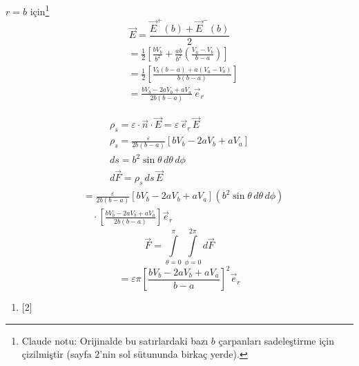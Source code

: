 \documentclass[11pt,a4paper]{article}
\begin{document}
$r=b$ için\footnote{Claude notu: Orijinalde bu satırlardaki bazı $b$ çarpanları sadeleştirme için çizilmiştir (sayfa 2'nin sol sütununda birkaç yerde).}
\[ \vec E=\frac{\vec E^{+}(b)+\vec E^{-}(b)}{2} \]
\begin{align*}
&=\frac12\left[\frac{bV_b}{b^2}+\frac{ab}{b^2}\left(\frac{V_a-V_b}{b-a}\right)\right]\\[2mm]
&=\frac12\left[\frac{V_b(b-a)+a(V_a-V_b)}{b(b-a)}\right]\\[2mm]
&=\frac{bV_b-2aV_b+aV_a}{2b(b-a)}\,\vec e_r
\end{align*}

\begin{gather*}
\rho_s=\varepsilon\cdot\vec n\cdot\vec E=\varepsilon\,\vec e_r\,\vec E\\
\rho_s=\frac{\varepsilon}{2b(b-a)}\left[bV_b-2aV_b+aV_a\right]\\
ds=b^2\sin\theta\,d\theta\,d\phi\\
d\vec F=\rho_s\,ds\,\vec E
\end{gather*}
\begin{align*}
&=\frac{\varepsilon}{2b(b-a)}\left[bV_b-2aV_b+aV_a\right]\left(b^2\sin\theta\,d\theta\,d\phi\right)\\
&\quad\cdot\left[\frac{bV_b-2aV_b+aV_a}{2b(b-a)}\right]\vec e_r
\end{align*}
\[ \vec F=\int\limits_{\theta=0}^{\pi}\int\limits_{\phi=0}^{2\pi}d\vec F \]
\[ =\varepsilon\pi\left[\frac{bV_b-2aV_b+aV_a}{b-a}\right]^{2}\vec e_r \]

\begin{enumerate}[start=2]
\item {}[2]
\end{enumerate}
\end{document}
